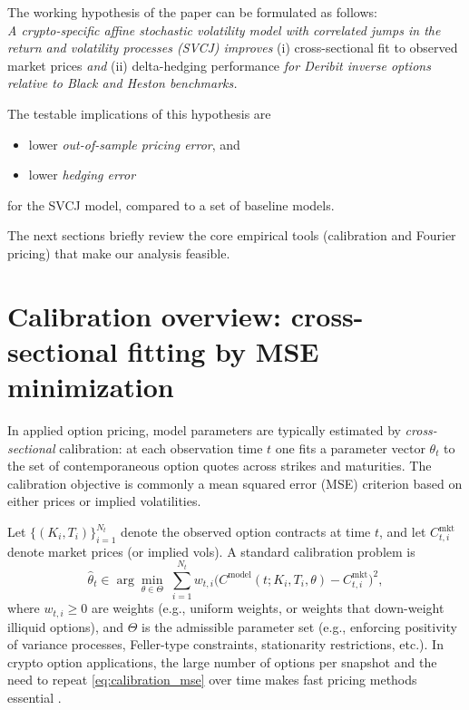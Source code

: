 \documentclass[a4paper,titlepage,12pt]{report}
\theoremstyle{plain}
\begin{document}
The working hypothesis of the paper can be formulated as follows:\\ \emph{A crypto-specific affine stochastic volatility model with correlated jumps in the return and volatility processes (SVCJ) improves} (i) cross-sectional fit to observed market prices \emph{and} (ii) delta-hedging performance \emph{for Deribit inverse options relative to Black and Heston benchmarks.}

The testable implications of this hypothesis are 
\begin{itemize}[topsep=0pt, itemsep=0pt, parsep=0pt]
  \item lower \emph{out-of-sample pricing error}, and
  \item lower \emph{hedging error}
\end{itemize}
for the SVCJ model, compared to a set of baseline models.

The next sections briefly review the core empirical tools (calibration and Fourier pricing) that make our analysis feasible.

\section{Calibration overview: cross-sectional fitting by MSE minimization}\label{sec:calibration_overview}

In applied option pricing, model parameters are typically estimated by \emph{cross-sectional}
calibration: at each observation time $t$ one fits a parameter vector $\theta_t$ to the set of
contemporaneous option quotes across strikes and maturities. The calibration objective is commonly a
mean squared error (MSE) criterion based on either prices or implied volatilities.

Let $\{(K_i,T_i)\}_{i=1}^{N_t}$ denote the observed option contracts at time $t$, and let
$C^{\text{mkt}}_{t,i}$ denote market prices (or implied vols). A standard calibration problem is
\begin{equation}
\widehat{\theta}_t \in \arg\min_{\theta\in\Theta}\;
\sum_{i=1}^{N_t} w_{t,i}\Big(C^{\text{model}}(t;K_i,T_i,\theta)-C^{\text{mkt}}_{t,i}\Big)^2,
\label{eq:calibration_mse}
\end{equation}
where $w_{t,i}\ge 0$ are weights (e.g., uniform weights, or weights that down-weight illiquid options),
and $\Theta$ is the admissible parameter set (e.g., enforcing positivity of variance processes,
Feller-type constraints, stationarity restrictions, etc.). In crypto option applications, the large
number of options per snapshot and the need to repeat \eqref{eq:calibration_mse} over time makes fast
pricing methods essential \citep{MadanReynersSchoutens2019}.
\end{document}
